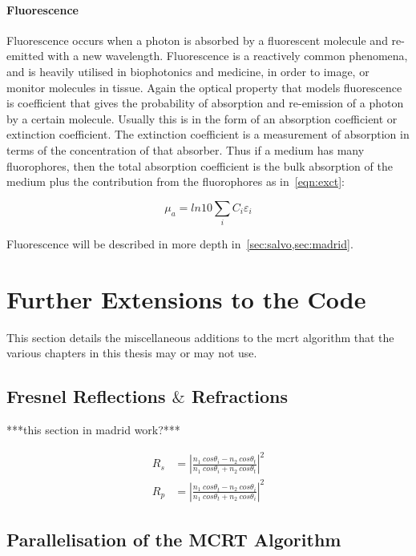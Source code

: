 \medskip

\paragraph*{Fluorescence}
Fluorescence occurs when a photon is absorbed by a fluorescent molecule and re-emitted with a new wavelength. Fluorescence	is a reactively common phenomena, and is heavily utilised in biophotonics and medicine, in order to image, or monitor molecules in tissue. Again the optical property that models fluorescence is coefficient that gives the probability of absorption and re-emission of a photon by a certain molecule. Usually this is in the form of an absorption coefficient or extinction coefficient. The extinction coefficient is a measurement of absorption in terms of the concentration of that absorber. Thus if a medium has many fluorophores, then the total absorption coefficient is the bulk absorption of the medium plus the contribution from the fluorophores as in~\cref{eqn:exct}:

\begin{equation}
\mu_a=ln10 \sum_i C_i \varepsilon_i
\label{eqn:exct}	
\end{equation}

Fluorescence will be described in more depth in~\cref{sec:salvo,sec:madrid}.

\section{Further Extensions to the Code}\label{sec:codefurther}
This section details the miscellaneous additions to the \gls{mcrt} algorithm that the various chapters in this thesis may or may not use.

\subsection{Fresnel Reflections \texorpdfstring{$\&$}{and} Refractions}\label{sec:fresnel}
***this section in madrid work?***


\begin{align}
	R_s&=\left|\frac{n_1\ cos\theta_i-n_2\ cos\theta_t}{n_1\ cos\theta_i+n_2\ cos\theta_t}\right|^2\\
	R_p&=\left|\frac{n_1\ cos\theta_t-n_2\ cos\theta_i}{n_1\ cos\theta_t+n_2\ cos\theta_i}\right|^2
\end{align}

\subsection{Parallelisation of the MCRT Algorithm}\label{sec:parasec}

